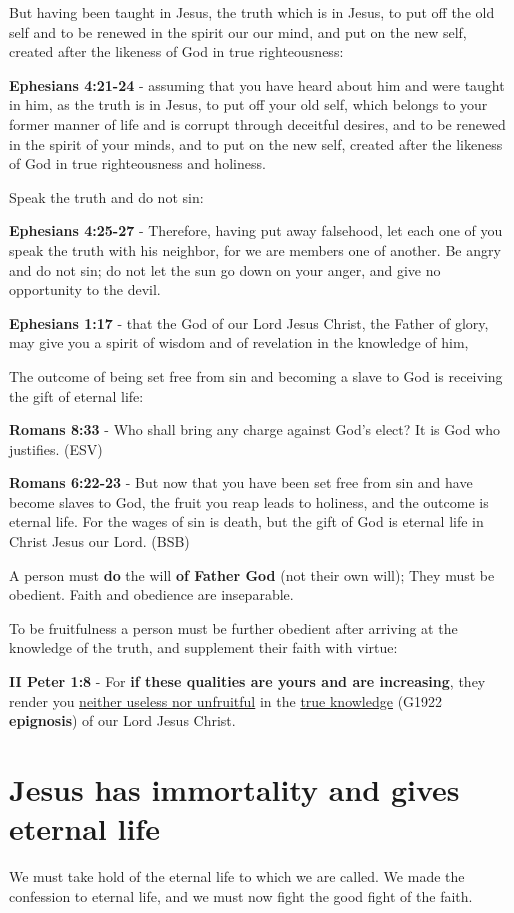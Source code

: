 \documentclass[11pt]{article}
\begin{document}
But having been taught in Jesus, the truth which is in Jesus, to put off the old self and to be renewed in the spirit our our mind, and put on the new self, created after the likeness of God in true righteousness:

\textbf{Ephesians 4:21-24} - assuming that you have heard about him and were taught in him, as the truth is in Jesus, to put off your old self, which belongs to your former manner of life and is corrupt through deceitful desires, and to be renewed in the spirit of your minds, and to put on the new self, created after the likeness of God in true righteousness and holiness.

Speak the truth and do not sin:

\textbf{Ephesians 4:25-27} - Therefore, having put away falsehood, let each one of you speak the truth with his neighbor, for we are members one of another. Be angry and do not sin; do not let the sun go down on your anger, and give no opportunity to the devil.

\textbf{Ephesians 1:17} - that the God of our Lord Jesus Christ, the Father of glory, may give you a spirit of wisdom and of revelation in the knowledge of him,

The outcome of being set free from sin and becoming a slave to God is receiving the gift of eternal life:

\textbf{Romans 8:33} -  Who shall bring any charge against God's elect?  It is God who justifies.  (ESV)

\textbf{Romans 6:22-23} - But now that you have been set free from sin and have become slaves to God, the fruit you reap leads to holiness, and the outcome is eternal life. For the wages of sin is death, but the gift of God is eternal life in Christ Jesus our Lord. (BSB)

A person must \textbf{do} the will \textbf{of Father God} (not their own will); They must be obedient.
Faith and obedience are inseparable.

To be fruitfulness a person must be further obedient after arriving at the knowledge of the truth, and supplement their faith with virtue:

\textbf{II Peter 1:8} - For \textbf{if these qualities are yours and are increasing}, they render you \uline{neither useless nor unfruitful} in the \uline{true knowledge} (G1922 \textbf{epignosis}) of our Lord Jesus Christ.

\section{Jesus has immortality and gives eternal life}
\label{sec:orgb9a1534}
We must take hold of the eternal life to which we are called.
We made the confession to eternal life, and we must now fight the good fight of the faith.
\end{document}
